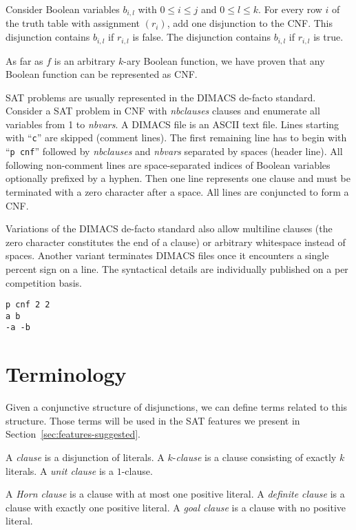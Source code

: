 Consider Boolean variables $b_{i,l}$ with $0 \leq i \leq j$ and $0 \leq l \leq k$.
For every row $i$ of the truth table with assignment $(r_i)$, add one disjunction to the CNF.
This disjunction contains $b_{i,l}$ if $r_{i,l}$ is false.
The disjunction contains $b_{i,l}$ if $r_{i,l}$ is true.

As far as $f$ is an arbitrary $k$-ary Boolean function, we have proven that
any Boolean function can be represented as CNF.

SAT problems are usually represented in the DIMACS de-facto standard.
Consider a SAT problem in CNF with \emph{nbclauses} clauses and
enumerate all variables from 1 to \emph{nbvars}. A DIMACS file is an ASCII text
file. Lines starting with \enquote{\texttt{c}} are skipped (comment lines).
The first remaining line has to begin with \enquote{\texttt{p cnf}} followed by
\emph{nbclauses} and \emph{nbvars} separated by spaces (header line).
All following non-comment lines are space-separated indices of Boolean variables
optionally prefixed by a hyphen. Then one line represents one clause and
must be terminated with a zero character after a space. All lines are conjuncted
to form a CNF.

Variations of the DIMACS de-facto standard also allow multiline clauses (the
zero character constitutes the end of a clause) or arbitrary whitespace instead of
spaces. Another variant terminates DIMACS files once it encounters a single
percent sign on a line. The syntactical details are individually published
on a per competition basis.

\renewcommand{\lstlistingname}{Listing}  %
\begin{lstlisting}[caption={CNF of the \boolf{XOR} in Display~\eqref{eq:xor}}]
p cnf 2 2
a b
-a -b
\end{lstlisting}

\section{Terminology}
\label{sec:sat-terminology}
%
Given a conjunctive structure of disjunctions, we can define terms
related to this structure. Those terms will be used in the SAT features
we present in Section~\ref{sec:features-suggested}.

\begin{defi}
  A \emph{clause} is a disjunction of literals.
  A $k$-\emph{clause} is a clause consisting of exactly $k$ literals.
  A \emph{unit clause} is a $1$-clause.

  A \emph{Horn clause} is a clause with at most one positive literal.
  A \emph{definite clause} is a clause with exactly one positive literal.
  A \emph{goal clause} is a clause with no positive literal.
\end{defi}

